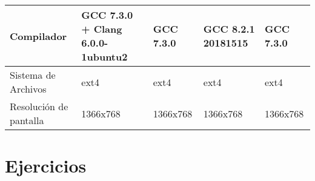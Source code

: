 \documentclass{article}
\begin{document}
\begin{table}
\begin{tabularx}{\linewidth}{|L|L|L|L|L|}
Compilador             & GCC 7.3.0 + Clang 6.0.0-1ubuntu2                       & GCC 7.3.0                                                   & GCC 8.2.1 20181515                                                     & GCC 7.3.0                                                \\ \hline
{}Sistema de Archivos    & ext4                                                   & ext4                                                        & ext4                                                                   & ext4                                                     \\ \hline
{}Resolución de pantalla & 1366x768                                               & 1366x768                                                    & 1366x768                                                               & 1366x768                                                 \\ \hline
\end{tabularx}
\end{table}


    \section{Ejercicios}
\end{document}
